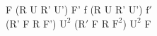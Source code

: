 F (R U R' U') F' f (R U R' U') $\text{f}'$\\
(R' F R F') $\text{U}^2$ ($\text{R}'$ F R $\text{F}^{2}$) $\text{U}^2$ F\\
